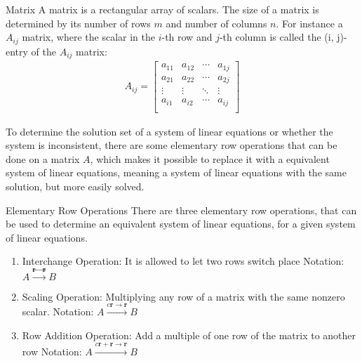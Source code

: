 \begin{definition}{Matrix}
A matrix is a rectangular array of scalars. The size of a matrix is determined by its number of rows $m$ and number of columns $n$. 
For instance a $A_{ij}$ matrix, where the scalar in the $i$-th row and $j$-th column is called the (i, j)-entry of the $A_{ij}$ matrix:
\begin{align*}
    A_{ij} = 
    \begin{bmatrix}
    a_{1 1} & a_{1 2} & \cdots & a_{1 j}\\
    a_{2 1} & a_{2 2} & \cdots & a_{2 j}\\
    \vdots  &   \vdots &  \ddots   & \vdots \\
    a_{i 1} & a_{i 2} & \cdots & a_{i j}\\
    \end{bmatrix}
\end{align*}
\end{definition}
To determine the solution set of a system of linear equations or whether the system is inconsistent, there are some elementary row operations that can be done on a matrix $A$, which makes it possible to replace it with a equivalent system of linear equations, meaning a system of linear equations with the same solution, but more easily solved.
\begin{definition}{Elementary Row Operations}
There are three elementary row operations, that can be used to determine an equivalent system of linear equations, for a given system of linear equations. 
\begin{enumerate}
    \item Interchange Operation:
    It is allowed to let two rows switch place 
    Notation: $A\xrightarrow{\textbf{r}\leftrightarrow \textbf{r}} B$ 
    \item Scaling Operation:
    Multiplying any row of a matrix with the same nonzero scalar.
    Notation: $A\xrightarrow{c\textbf{r}\rightarrow \textbf{r}} B$
    \item Row Addition Operation:
    Add a multiple of one row of the matrix to another row
    Notation: $A\xrightarrow{c\textbf{r}+\textbf{r}\rightarrow \textbf{r}} B$
\end{enumerate}
\end {definition}

